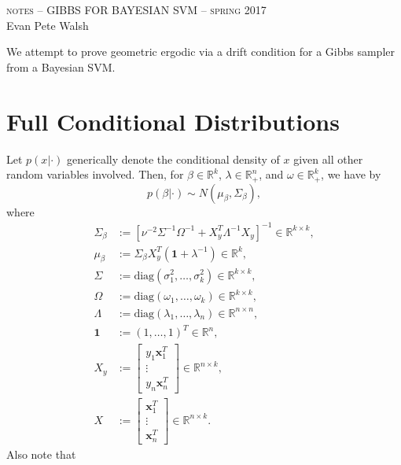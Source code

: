 \documentclass[12pt]{article}
\numberwithin{equation}{section}
\begin{document}
\thispagestyle{empty}
\begin{center}
  \Large \textsc{notes -- GIBBS FOR BAYESIAN SVM -- spring 2017} \\ 
  \vspace{5mm}
  \large Evan Pete Walsh
\end{center}
\vspace{1cm}

We attempt to prove geometric ergodic via a drift condition for a Gibbs sampler from a Bayesian SVM. 

\section{Full Conditional Distributions}

Let $p(x|\cdot)$ generically denote the conditional density of $x$ given all other random variables involved. Then, for $\beta \in \mathbb{R}^{k}$,
$\lambda \in \mathbb{R}_{+}^{n}$, and $\omega \in \mathbb{R}_{+}^{k}$, we have by \cite{svm}
\[
  p(\beta|\cdot) \sim N(\mu_{\beta}, \Sigma_{\beta}),
\]
where 
\begin{align*}
  \Sigma_{\beta} & := [\nu^{-2}\Sigma^{-1}\Omega^{-1} + X_{y}^{T}\Lambda^{-1} X_{y}]^{-1} \in \mathbb{R}^{k\times k}, \\
  \mu_{\beta} & := \Sigma_{\beta}X_{y}^{T}(\bm{1} + \lambda^{-1}) \in \mathbb{R}^{k}, \\
  \Sigma & := \text{diag}(\sigma_1^2,\dots, \sigma_k^2) \in \mathbb{R}^{k\times k}, \\
  \Omega & := \text{diag}(\omega_1, \dots, \omega_k) \in \mathbb{R}^{k\times k}, \\
  \Lambda & := \text{diag}(\lambda_1, \dots, \lambda_n) \in \mathbb{R}^{n\times n}, \\
  \bm{1} & := (1, \dots, 1)^T \in \mathbb{R}^{n}, \\
  X_{y} & := \begin{bmatrix}
    y_1 \bm{x}_1^T \\
    \vdots \\
    y_n \bm{x}_n^T 
  \end{bmatrix} \in \mathbb{R}^{n\times k}, \\
  X & := \begin{bmatrix}
    \bm{x}_1^T \\
    \vdots \\
    \bm{x}_n^T 
  \end{bmatrix} \in \mathbb{R}^{n\times k}.
\end{align*}
Also note that 
\end{document}
